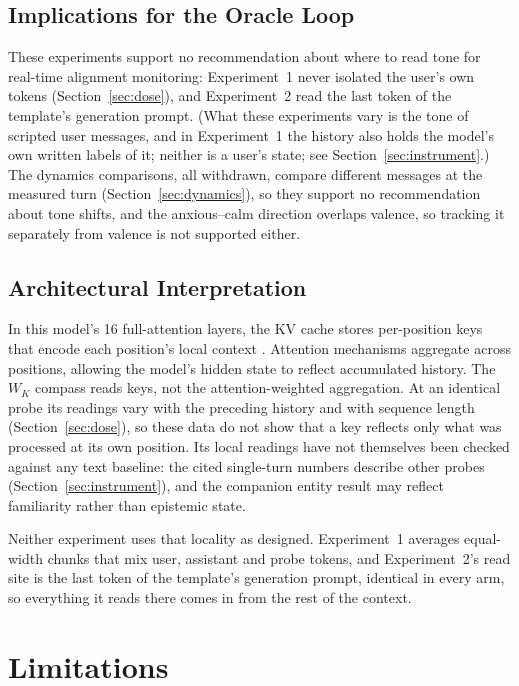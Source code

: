 \documentclass[11pt,a4paper]{article}
\begin{document}
\subsection{Implications for the Oracle Loop}

These experiments support no recommendation about where to read tone
for real-time alignment monitoring: Experiment~1 never isolated the
user's own tokens (Section~\ref{sec:dose}), and Experiment~2 read the last token of the template's generation prompt. (What these experiments vary is the tone of scripted user messages,
and in Experiment~1 the history also holds the model's own written
labels of it; neither is a user's state; see
Section~\ref{sec:instrument}.) The dynamics comparisons, all withdrawn, compare
different messages at the measured turn (Section~\ref{sec:dynamics}), so
they support no recommendation about tone shifts, and the anxious--calm
direction overlaps valence, so tracking it separately from valence is
not supported either.

\subsection{Architectural Interpretation}

In this model's 16 full-attention layers, the KV cache stores
per-position keys that encode each position's local
context \citep{vaswani2017attention}. Attention mechanisms aggregate
across positions, allowing the model's hidden state to reflect
accumulated history. The $W_K$ compass reads keys, not the attention-weighted
aggregation. At an identical probe its readings vary with the preceding
history and with sequence length (Section~\ref{sec:dose}), so these data
do not show that a key reflects only what was processed at its own
position. Its
local readings have not themselves been checked against any text baseline: the cited
single-turn numbers describe other probes (Section~\ref{sec:instrument}), and
the companion entity result may reflect familiarity rather than epistemic state.

Neither experiment uses that locality as designed. Experiment~1
averages equal-width chunks that mix user, assistant and probe tokens,
and Experiment~2's read site is the last token of the template's generation prompt, identical in every arm, so
everything it reads there comes in from the rest of the context.

\section{Limitations}
\end{document}
